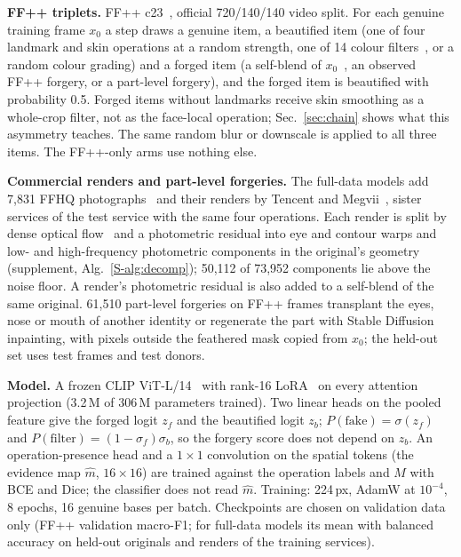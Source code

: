\documentclass[conference]{IEEEtran}
\begin{document}
\textbf{FF++ triplets.} FF++ c23~\cite{ffpp}, official 720/140/140 video split. For each genuine training frame $x_0$ a step
draws a genuine item, a beautified item (one of four landmark and skin operations at a random strength, one of 14 colour
filters~\cite{pilgram}, or a random colour grading) and a forged item (a self-blend of $x_0$~\cite{sbi}, an observed FF++
forgery, or a part-level forgery), and the forged item is beautified with probability 0.5. Forged items without landmarks
receive skin smoothing as a whole-crop filter, not as the face-local operation; Sec.~\ref{sec:chain} shows what this asymmetry
teaches. The same random blur or downscale is applied to all three items. The FF++-only arms use nothing else.

\textbf{Commercial renders and part-level forgeries.} The full-data models add 7,831 FFHQ photographs~\cite{ffhq} and their
renders by Tencent and Megvii~\cite{retouchingffhq}, sister services of the test service with the same four operations. Each
render is split by dense optical flow~\cite{dis} and a photometric residual into eye and contour warps and low- and
high-frequency photometric components in the original's geometry (supplement, Alg.~\ref{S-alg:decomp}); 50,112 of 73,952
components lie above the noise floor. A render's photometric residual is also added to a self-blend of the same original.
61,510 part-level forgeries on FF++ frames transplant the eyes, nose or mouth of another identity or regenerate the part with
Stable Diffusion inpainting, with pixels outside the feathered mask copied from $x_0$; the held-out set uses test frames and
test donors.

\textbf{Model.} A frozen CLIP ViT-L/14~\cite{clip} with rank-16 LoRA~\cite{lora} on every attention projection (3.2\,M of
306\,M parameters trained). Two linear heads on the pooled feature give the forged logit $z_f$ and the beautified logit $z_b$;
$P(\text{fake})=\sigma(z_f)$ and $P(\text{filter})=(1-\sigma_f)\sigma_b$, so the forgery score does not depend on $z_b$. An
operation-presence head and a $1\times1$ convolution on the spatial tokens (the evidence map $\hat m$, $16\times16$) are
trained against the operation labels and $M$ with BCE and Dice; the classifier does not read $\hat m$. Training: 224\,px,
AdamW at $10^{-4}$, 8 epochs, 16 genuine bases per batch. Checkpoints are chosen on validation data only (FF++ validation
macro-F1; for full-data models its mean with balanced accuracy on held-out originals and renders of the training services).

\end{document}
